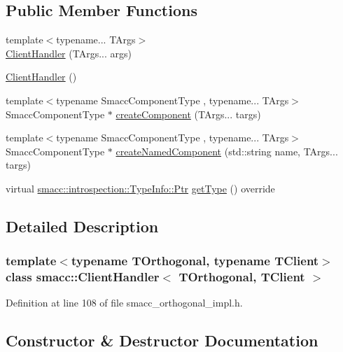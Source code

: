 \subsection*{Public Member Functions}
\begin{DoxyCompactItemize}
\item 
{\footnotesize template$<$typename... T\+Args$>$ }\\\hyperlink{classsmacc_1_1ClientHandler_a5f92ec0fcc8bf24d2d5ef6eb60e987d7}{Client\+Handler} (T\+Args... args)
\item 
\hyperlink{classsmacc_1_1ClientHandler_a73f354900b489edacad7ccb411c272da}{Client\+Handler} ()
\item 
{\footnotesize template$<$typename Smacc\+Component\+Type , typename... T\+Args$>$ }\\Smacc\+Component\+Type $\ast$ \hyperlink{classsmacc_1_1ClientHandler_a4a9adad4c37104586c9b595d9030bb3c}{create\+Component} (T\+Args... targs)
\item 
{\footnotesize template$<$typename Smacc\+Component\+Type , typename... T\+Args$>$ }\\Smacc\+Component\+Type $\ast$ \hyperlink{classsmacc_1_1ClientHandler_a33f440a8e06038df0dd291d2ea278f39}{create\+Named\+Component} (std\+::string name, T\+Args... targs)
\item 
virtual \hyperlink{classsmacc_1_1introspection_1_1TypeInfo_aa6ffd9c39811d59f7c771941b7fad860}{smacc\+::introspection\+::\+Type\+Info\+::\+Ptr} \hyperlink{classsmacc_1_1ClientHandler_a018a50262de782c479414cf18daddac9}{get\+Type} () override
\end{DoxyCompactItemize}


\subsection{Detailed Description}
\subsubsection*{template$<$typename T\+Orthogonal, typename T\+Client$>$\newline
class smacc\+::\+Client\+Handler$<$ T\+Orthogonal, T\+Client $>$}



Definition at line 108 of file smacc\+\_\+orthogonal\+\_\+impl.\+h.



\subsection{Constructor \& Destructor Documentation}
\mbox{\label{classsmacc_1_1ClientHandler_a5f92ec0fcc8bf24d2d5ef6eb60e987d7}} 

